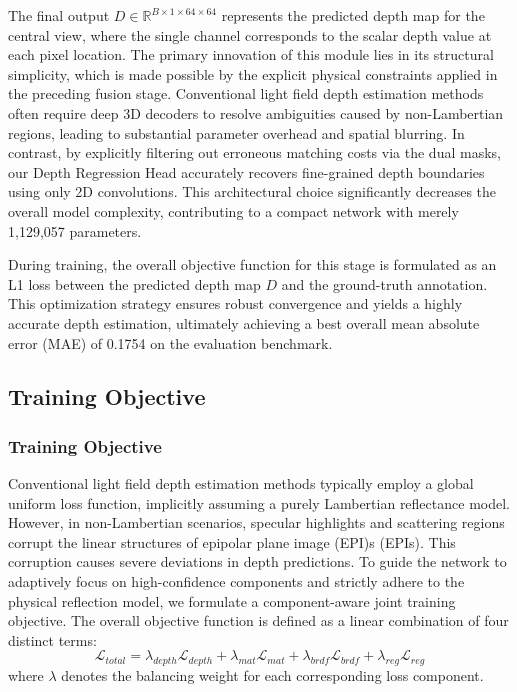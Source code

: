 The final output $D \in \mathbb{R}^{B \times 1 \times 64 \times 64}$ represents the predicted depth map for the central view, where the single channel corresponds to the scalar depth value at each pixel location. The primary innovation of this module lies in its structural simplicity, which is made possible by the explicit physical constraints applied in the preceding fusion stage. Conventional light field depth estimation methods often require deep 3D decoders to resolve ambiguities caused by non-Lambertian regions, leading to substantial parameter overhead and spatial blurring. In contrast, by explicitly filtering out erroneous matching costs via the dual masks, our Depth Regression Head accurately recovers fine-grained depth boundaries using only 2D convolutions. This architectural choice significantly decreases the overall model complexity, contributing to a compact network with merely 1,129,057 parameters.

During training, the overall objective function for this stage is formulated as an L1 loss between the predicted depth map $D$ and the ground-truth annotation. This optimization strategy ensures robust convergence and yields a highly accurate depth estimation, ultimately achieving a best overall mean absolute error (MAE) of 0.1754 on the evaluation benchmark.

\subsection{Training Objective}

\subsubsection{Training Objective}

Conventional light field depth estimation methods typically employ a global uniform loss function, implicitly assuming a purely Lambertian reflectance model. However, in non-Lambertian scenarios, specular highlights and scattering regions corrupt the linear structures of epipolar plane image (EPI)s (EPIs). This corruption causes severe deviations in depth predictions. To guide the network to adaptively focus on high-confidence components and strictly adhere to the physical reflection model, we formulate a component-aware joint training objective. The overall objective function is defined as a linear combination of four distinct terms:
\begin{equation}
\label{eq:eq28}
\mathcal{L}_{total} = \lambda_{depth} \mathcal{L}_{depth} + \lambda_{mat} \mathcal{L}_{mat} + \lambda_{brdf} \mathcal{L}_{brdf} + \lambda_{reg} \mathcal{L}_{reg}
\end{equation}
where $\lambda$ denotes the balancing weight for each corresponding loss component.

